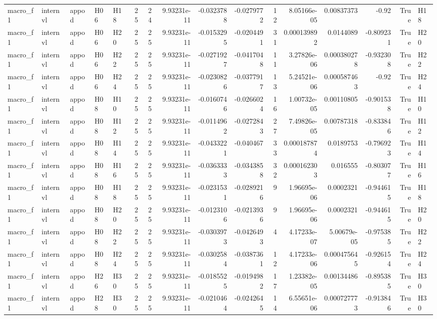\begin{table}[tbp]
\begin{tabular}{lllllrrrrrrrrrrl}
macro\_f1 & internvl & appod & H06 & H18 & 25 & 24 & 9.93231e-11 & -0.0323788 & -0.0279772 & 12 & 8.05166e-05 & 0.00837373 & -0.92 & True & H18 \\
macro\_f1 & internvl & appod & H06 & H20 & 25 & 25 & 9.93231e-11 & -0.0153295 & -0.0204491 & 31 & 0.000139892 & 0.0144089 & -0.809231 & True & H20 \\
macro\_f1 & internvl & appod & H06 & H22 & 25 & 25 & 9.93231e-11 & -0.0271927 & -0.0417048 & 11 & 3.27826e-06 & 0.000380278 & -0.932308 & True & H22 \\
macro\_f1 & internvl & appod & H06 & H24 & 25 & 25 & 9.93231e-11 & -0.0230826 & -0.0377917 & 13 & 5.24521e-06 & 0.000587463 & -0.92 & True & H24 \\
macro\_f1 & internvl & appod & H08 & H10 & 25 & 25 & 9.93231e-11 & -0.0160746 & -0.0266024 & 16 & 1.00732e-05 & 0.00110805 & -0.901538 & True & H10 \\
macro\_f1 & internvl & appod & H08 & H12 & 25 & 25 & 9.93231e-11 & -0.0114962 & -0.0272843 & 27 & 7.49826e-05 & 0.00787318 & -0.833846 & True & H12 \\
macro\_f1 & internvl & appod & H08 & H14 & 25 & 25 & 9.93231e-11 & -0.0433221 & -0.040467 & 33 & 0.000187874 & 0.0189753 & -0.796923 & True & H14 \\
macro\_f1 & internvl & appod & H08 & H16 & 25 & 25 & 9.93231e-11 & -0.0363333 & -0.0343858 & 32 & 0.000162303 & 0.016555 & -0.803077 & True & H16 \\
macro\_f1 & internvl & appod & H08 & H18 & 25 & 25 & 9.93231e-11 & -0.0231531 & -0.0289216 & 9 & 1.96695e-06 & 0.0002321 & -0.944615 & True & H18 \\
macro\_f1 & internvl & appod & H08 & H20 & 25 & 25 & 9.93231e-11 & -0.0123106 & -0.0213936 & 9 & 1.96695e-06 & 0.0002321 & -0.944615 & True & H20 \\
macro\_f1 & internvl & appod & H08 & H22 & 25 & 25 & 9.93231e-11 & -0.0303973 & -0.0426493 & 4 & 4.17233e-07 & 5.00679e-05 & -0.975385 & True & H22 \\
macro\_f1 & internvl & appod & H08 & H24 & 25 & 25 & 9.93231e-11 & -0.0302584 & -0.0387361 & 12 & 4.17233e-06 & 0.000475645 & -0.926154 & True & H24 \\
macro\_f1 & internvl & appod & H26 & H30 & 25 & 25 & 9.93231e-11 & -0.0185525 & -0.0194982 & 17 & 1.23382e-05 & 0.00134486 & -0.895385 & True & H30 \\
macro\_f1 & internvl & appod & H28 & H30 & 25 & 25 & 9.93231e-11 & -0.0210464 & -0.0242645 & 14 & 6.55651e-06 & 0.000727773 & -0.913846 & True & H30 \\
\bottomrule
\end{tabular}
\end{table}
